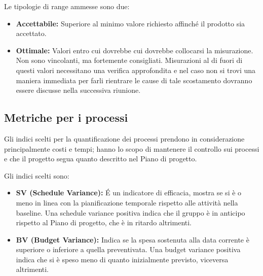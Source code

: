 \documentclass[a4paper]{report}
\begin{document}
			Le tipologie di range ammesse sono due:
			\begin{itemize}
				\item \textbf{Accettabile:} Superiore al minimo valore richiesto affinché il prodotto sia accettato.
				\item \textbf{Ottimale:} Valori entro cui dovrebbe cui dovrebbe collocarsi la misurazione. Non sono vincolanti,
				ma fortemente consigliati. Misurazioni al di fuori di questi valori necessitano una verifica approfondita e nel
				caso non si trovi una maniera immediata per farli rientrare le cause di tale scostamento dovranno essere
				discusse nella successiva riunione.
			\end{itemize}
			\subsection{Metriche per i processi}
				Gli indici scelti per la quantificazione dei processi prendono in considerazione principalmente costi e tempi;
				hanno lo scopo di mantenere il controllo sui processi e che il progetto segua quanto descritto nel Piano di
				progetto.
				
				Gli indici scelti sono:
				\begin{itemize}
					\item \textbf{SV (Schedule Variance):} É un indicatore di efficacia, mostra se si è o meno in linea con la
					pianificazione temporale rispetto alle attività nella baseline. Una schedule variance positiva indica che il
					gruppo è in anticipo rispetto al Piano di progetto, che è in ritardo altrimenti.
					\item \textbf{BV (Budget Variance):} Indica se la spesa sostenuta alla data corrente è superiore o inferiore a
					quella preventivata. Una budget variance positiva indica che si è speso meno di quanto inizialmente previsto,
					viceversa altrimenti.		
				\end{itemize}
				
				
\end{document}
